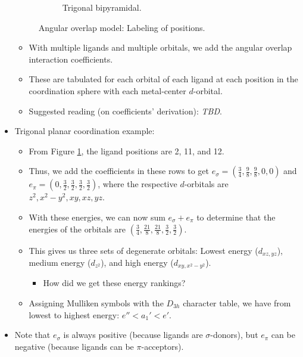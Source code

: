 \documentclass[../notes.tex]{subfiles}
\begin{document}
\begin{itemize}
\begin{figure}[h!]
\begin{subfigure}[b]{0.3\linewidth}
            \caption{Trigonal bipyramidal.}
            \label{fig:AOM-positionLabelingc}
        \end{subfigure}
        \caption{Angular overlap model: Labeling of positions.}
        \label{fig:AOM-positionLabeling}
    \end{figure}
    \begin{itemize}
        \item With multiple ligands and multiple orbitals, we add the angular overlap interaction coefficients.
        \item These are tabulated for each orbital of each ligand at each position in the coordination sphere with each metal-center $d$-orbital.
        \item Suggested reading (on coefficients' derivation): \emph{TBD}.
    \end{itemize}
    \item Trigonal planar coordination example:
    \begin{itemize}
        \item From Figure \ref{fig:AOM-positionLabelingc}, the ligand positions are 2, 11, and 12.
        \item Thus, we add the coefficients in these rows to get $e_\sigma=(\frac{3}{4},\frac{9}{8},\frac{9}{8},0,0)$ and $e_\pi=(0,\frac{3}{2},\frac{3}{2},\frac{3}{2},\frac{3}{2})$, where the respective $d$-orbitals are $z^2,x^2-y^2,xy,xz,yz$.
        \item With these energies, we can now sum $e_\sigma+e_\pi$ to determine that the energies of the orbitals are $(\frac{3}{4},\frac{21}{8},\frac{21}{8},\frac{3}{2},\frac{3}{2})$.
        \item This gives us three sets of degenerate orbitals: Lowest energy ($d_{xz,yz}$), medium energy ($d_{z^2}$), and high energy ($d_{xy,x^2-y^2}$).
        \begin{itemize}
            \item How did we get these energy rankings?
        \end{itemize}
        \item Assigning Mulliken symbols with the $D_{3h}$ character table, we have from lowest to highest energy: $e''<a_1'<e'$.
    \end{itemize}
    \item Note that $e_\sigma$ is always positive (because ligands are $\sigma$-donors), but $e_\pi$ can be negative (because ligands can be $\pi$-acceptors).

\end{itemize}
\end{document}
